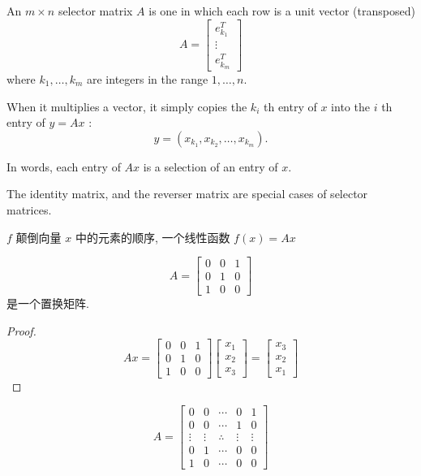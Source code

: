 \begin{definition}
    An $ m \times n $ selector matrix $ A $ is one in which each row is a unit vector (transposed)
$$
A=\left[\begin{array}{c}
e_{k_{1}}^{T} \\
\vdots \\
e_{k_{m}}^{T}
\end{array}\right]
$$
where $ k_{1}, \ldots, k_{m} $ are integers in the range $ 1, \ldots, n . $ 
\end{definition}

When it multiplies a vector, it simply copies the $ k_{i} $ th entry of $ x $ into the $ i $ th entry of $ y=A x $ :
$$
y=\left(x_{k_{1}}, x_{k_{2}}, \ldots, x_{k_{m}}\right) .
$$

In words, each entry of $ A x $ is a selection of an entry of $ x $.

The identity matrix, and the reverser matrix are special cases of selector matrices.

\begin{definition}
    $ f $ 颠倒向量 $ x $ 中的元素的顺序, 一个线性函数 $ f(x)=A x $

    $$ A=\left[\begin{array}{lll}0 & 0 & 1 \\ 0 & 1 & 0 \\ 1 & 0 & 0\end{array}\right] $$是一个置换矩阵.
\end{definition}

\begin{proof}
    $$ A x=\left[\begin{array}{lll}0 & 0 & 1 \\ 0 & 1 & 0 \\ 1 & 0 & 0\end{array}\right]\left[\begin{array}{l}x_{1} \\ x_{2} \\ x_{3}\end{array}\right]=\left[\begin{array}{l}x_{3} \\ x_{2} \\ x_{1}\end{array}\right] $$
\end{proof}

\begin{definition}
    $$ A=\left[\begin{array}{ccccc}0 & 0 & \cdots & 0 & 1 \\ 0 & 0 & \cdots & 1 & 0 \\ \vdots & \vdots & \therefore & \vdots & \vdots \\ 0 & 1 & \cdots & 0 & 0 \\ 1 & 0 & \cdots & 0 & 0\end{array}\right] $$
\end{definition}

